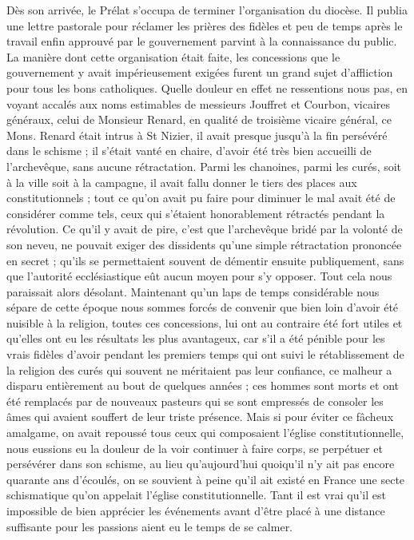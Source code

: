 \documentclass[11pt,a4paper]{report}
\begin{document}
Dès son arrivée, le Prélat s'occupa de terminer l'organisation du diocèse. Il publia une lettre pastorale pour réclamer les prières des fidèles et peu de temps après le travail enfin approuvé par le gouvernement parvint à la connaissance du public. La manière dont cette organisation était faite, les concessions que le gouvernement y avait impérieusement exigées furent un grand sujet d'affliction pour tous les bons catholiques. Quelle douleur en effet ne ressentions nous pas, en voyant accalés aux noms estimables de messieurs Jouffret et Courbon, vicaires généraux, celui de Monsieur Renard, en qualité de troisième vicaire général, ce Mons. Renard était intrus à St Nizier, il avait presque jusqu'à la fin persévéré dans le schisme ; il s'était vanté en chaire, d'avoir été très bien accueilli de l'archevêque, sans aucune rétractation. Parmi les chanoines, parmi les curés, soit à la ville soit à la campagne, il avait fallu donner le tiers des places aux constitutionnels ; tout ce qu'on avait pu faire pour diminuer le mal avait été de considérer comme tels, ceux qui s'étaient honorablement rétractés pendant la révolution. Ce qu'il y avait de pire, c'est que l'archevêque bridé par la volonté de son neveu, ne pouvait exiger des dissidents qu'une simple rétractation prononcée en secret ; qu'ils se permettaient souvent de démentir ensuite publiquement, sans que l'autorité ecclésiastique eût aucun moyen pour s'y opposer. Tout cela nous paraissait alors désolant. Maintenant qu'un laps de temps considérable nous sépare de cette époque nous sommes forcés de convenir que bien loin d'avoir été nuisible à la religion, toutes ces concessions, lui ont au contraire été fort utiles et qu'elles ont eu les résultats les plus avantageux, car s'il a été pénible pour les vrais fidèles d'avoir pendant les premiers temps qui ont suivi le rétablissement de la religion des curés qui souvent ne méritaient pas leur confiance, ce malheur a disparu entièrement au bout de quelques années ; ces hommes sont morts et ont été remplacés par de nouveaux pasteurs qui se sont empressés de consoler les âmes qui avaient souffert de leur triste présence. Mais si pour éviter ce fâcheux amalgame, on avait repoussé tous ceux qui composaient l'église constitutionnelle, nous eussions eu la douleur de la voir continuer à faire corps, se perpétuer et persévérer dans son schisme, au lieu qu'aujourd'hui quoiqu'il n'y ait pas encore quarante ans d'écoulés, on se souvient à peine qu'il ait existé en France une secte schismatique qu'on appelait l'église constitutionnelle. Tant il est vrai qu'il est impossible de bien apprécier les événements avant d'être placé à une distance suffisante pour les passions aient eu le temps de se calmer.
\end{document}
